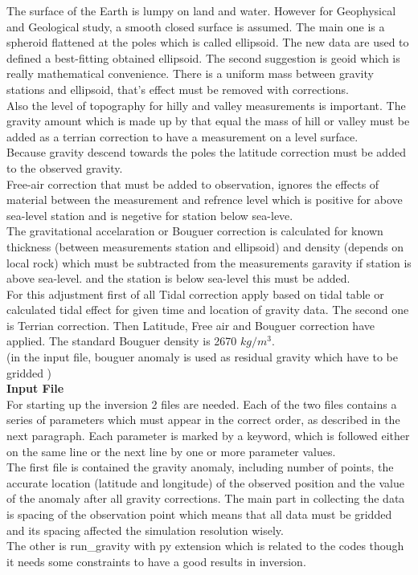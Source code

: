 The surface of the Earth is lumpy on land and water. However for Geophysical and Geological study, a smooth closed surface is assumed. The main one is a spheroid flattened at the poles which is called ellipsoid. The new data are used to defined a best-fitting obtained ellipsoid. The second suggestion is geoid which is really mathematical convenience. There is a uniform mass between gravity stations and ellipsoid, that's effect must be removed with corrections.\\ 

Also the level of topography for hilly and valley measurements is important. The gravity amount which is made up by that equal the mass of hill or valley must be added as a terrian correction to have a measurement on a level surface.\\
Because gravity descend towards the poles the latitude correction must be added to the observed gravity.\\
Free-air correction that must be added to observation, ignores the effects of material between the measurement and refrence level which is positive for above sea-level station and is negetive for station below sea-leve.\\
The gravitational accelaration or Bouguer correction is calculated for known thickness (between measurements station and ellipsoid) and density (depends on local rock) which must be subtracted from the measurements garavity if station is above sea-level. and the station is below sea-level this must be added.\\

For this adjustment first of all Tidal correction apply based on tidal table or calculated tidal effect for given time and location of gravity data. The second one is Terrian correction. Then Latitude, Free air and Bouguer correction have applied. The standard Bouguer density is 2670 $kg/m^3$.\\

(in the input file, bouguer anomaly is used as residual gravity  which have to be gridded )\\

\textbf{Input File} \\

For starting up the inversion 2 files are needed. Each of the two files contains a series of parameters which must appear in the correct order, as described in the next paragraph. Each parameter is marked by a keyword, which is followed either on the same line or the next line by one or more parameter values. \\
The first file is contained the gravity anomaly, including number of points, the accurate location (latitude and longitude) of the observed position and the value of the anomaly after all gravity corrections. The main part in collecting the data is spacing of the observation point which means that all data must be gridded and its spacing affected the simulation resolution wisely.\\
The other is run_gravity with py extension which is related to the codes though it needs some constraints to have a good results in inversion.\\

